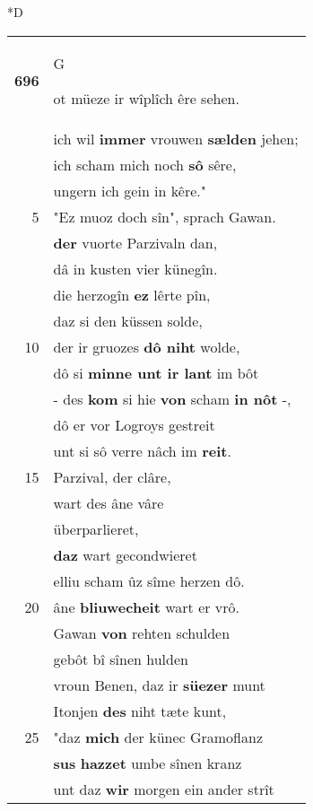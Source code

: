\documentclass[8pt,a4paper,notitlepage]{article}
\begin{document}
\begin{table}[ht]
\begin{minipage}[t]{0.5\linewidth}
\small
\begin{center}*D
\end{center}
\begin{tabular}{rl}
\textbf{696} & \begin{large}G\end{large}ot müeze ir wîplîch êre sehen.\\ 
 & ich wil \textbf{immer} vrouwen \textbf{sælden} jehen;\\ 
 & ich scham mich noch \textbf{sô} sêre,\\ 
 & ungern ich gein in kêre."\\ 
5 & "Ez muoz doch sîn", sprach Gawan.\\ 
 & \textbf{der} vuorte Parzivaln dan,\\ 
 & dâ in kusten vier künegîn.\\ 
 & die herzogîn \textbf{ez} lêrte pîn,\\ 
 & daz si den küssen solde,\\ 
10 & der ir gruozes \textbf{dô niht} wolde,\\ 
 & dô si \textbf{minne unt ir lant} im bôt\\ 
 & - des \textbf{kom} si hie \textbf{von} scham \textbf{in nôt} -,\\ 
 & dô er vor Logroys gestreit\\ 
 & unt si sô verre nâch im \textbf{reit}.\\ 
15 & Parzival, der clâre,\\ 
 & wart des âne vâre\\ 
 & überparlieret,\\ 
 & \textbf{daz} wart gecondwieret\\ 
 & elliu scham ûz sîme herzen dô.\\ 
20 & âne \textbf{bliuwecheit} wart er vrô.\\ 
 & Gawan \textbf{von} rehten schulden\\ 
 & gebôt bî sînen hulden\\ 
 & vroun Benen, daz ir \textbf{süezer} munt\\ 
 & Itonjen \textbf{des} niht tæte kunt,\\ 
25 & "daz \textbf{mich} der künec Gramoflanz\\ 
 & \textbf{sus} \textbf{hazzet} umbe sînen kranz\\ 
 & unt daz \textbf{wir} morgen ein ander strît\\ 

\end{tabular}
\end{minipage}
\end{table}
\end{document}
